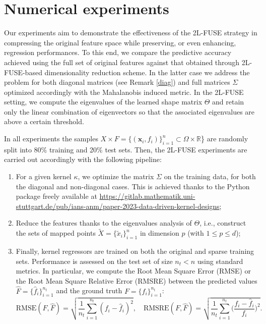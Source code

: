 \documentclass[hyphens,a4paper,11pt]{article}
\newcommand{\mTheta}{\mathsf{\Theta}}
\newcommand{\mSigma}{\mathsf{\Sigma}}
\begin{document}
\section{Numerical experiments}
\label{numerics}

Our experiments aim to demonstrate the effectiveness of the 2L-FUSE strategy in compressing the original feature space while preserving, or even enhancing, regression performances. To this end, we compare the predictive accuracy achieved using the full set of original features against that obtained through 2L-FUSE-based dimensionality reduction scheme. In the latter case we address the problem for both diagonal matrices (see Remark \ref{diag}) and full matrices $\mSigma$ optimized accordingly with the  Mahalanobis induced metric. In the 2L-FUSE setting, we compute the eigenvalues of the learned shape matrix $\mTheta$ and retain only the linear combination of eigenvectors so that the associated eigenvalues are above a certain threshold. 

In all experiments the samples \(X \times F=\{(\boldsymbol{x}_i,f_i)\}_{i=1}^n \subset \Omega \times \mathbb{R}\)\} are randomly split into 80$\%$ training and 20$\%$ test sets. Then, the 2L-FUSE experiments are carried out accordingly with the following pipeline:
\begin{enumerate}
    \item For a given kernel \(\kappa\), we optimize the matrix \(\mSigma\) on the training data, for both the diagonal and non-diagonal cases. This is achieved thanks to the Python package freely available at \url{https://gitlab.mathematik.uni-stuttgart.de/pub/ians-anm/paper-2023-data-driven-kernel-designs};
    \item Reduce the features thanks to the eigenvalues analysis of $\mTheta$, i.e., construct the sets of mapped points $\tilde{X}=\{\tilde{x}_i\}_{i=1}^n$ in dimension $p$ (with $1\leq p \leq d$);%
    \item Finally, kernel regressors are trained on both the original and sparse training sets. Performance is assessed on the test set of size \(n_t < n\) using standard  metrics. In particular, we compute the Root Mean Square Error (RMSE) or the Root Mean Square Relative Error (RMSRE)  between the predicted values \(\hat{F} = \{\hat{f}_i\}_{i=1}^{n_t}\) and the ground truth \({F} = \{{f}_i\}_{i=1}^{n_t}\):
\[
\text{RMSE}(F, \hat{F}) = \sqrt{\dfrac{1}{n_t} \sum_{i=1}^{n_t} (f_i - \hat{f}_i)^2}, \quad \text{RMSRE}(F,\hat{F}) = \sqrt{\dfrac{1}{n_t}\sum_{i=1}^{n_t}    \biggl(\dfrac{f_i-\hat{f}_i}{f_i} \biggl)^2}.
\]

\end{enumerate}
\end{document}
